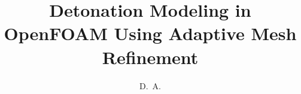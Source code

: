 \documentclass[defaultstyle,11pt]{thesis}
\title{Detonation Modeling in OpenFOAM Using Adaptive Mesh Refinement}
\author{D.~A.}{McGough}
\begin{document}
 




%

\nocite{*}		%

\appendix

%
\end{document}
